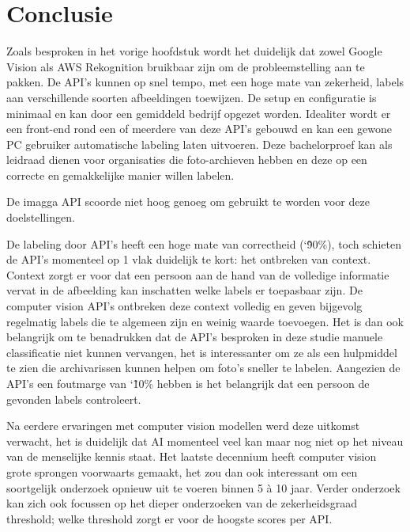 
\chapter{Conclusie}
\label{ch:conclusie}


Zoals besproken in het vorige hoofdstuk wordt het duidelijk dat zowel Google Vision als AWS Rekognition bruikbaar zijn om de probleemstelling aan te pakken. De API's kunnen op snel tempo, met een hoge mate van zekerheid, labels aan verschillende soorten afbeeldingen toewijzen. De setup en configuratie is minimaal en kan door een gemiddeld bedrijf opgezet worden. Idealiter wordt er een front-end rond een of meerdere van deze API's gebouwd en kan een gewone PC gebruiker automatische labeling laten uitvoeren. Deze bachelorproef kan als leidraad dienen voor organisaties die foto-archieven hebben en deze op een correcte en gemakkelijke manier willen labelen. 

De imagga API scoorde niet hoog genoeg om gebruikt te worden voor deze doelstellingen.

De labeling door API's heeft een hoge mate van correctheid (\char`\~ 90\%), toch schieten de API's momenteel op 1 vlak duidelijk te kort: het ontbreken van context. Context zorgt er voor dat een persoon aan de hand van de volledige informatie vervat in de afbeelding kan inschatten welke labels er toepasbaar zijn. De computer vision API's ontbreken deze context volledig en geven bijgevolg regelmatig labels die te algemeen zijn en weinig waarde toevoegen. Het is dan ook belangrijk om te benadrukken dat de API's besproken in deze studie manuele classificatie niet kunnen vervangen, het is interessanter om ze als een hulpmiddel te zien die archivarissen kunnen helpen om foto's sneller te labelen. Aangezien de API's een foutmarge van \char`\~ 10\% hebben is het belangrijk dat een persoon de gevonden labels controleert.

Na eerdere ervaringen met computer vision modellen werd deze uitkomst verwacht, het is duidelijk dat AI momenteel veel kan maar nog niet op het niveau van de menselijke kennis staat. Het laatste decennium heeft computer vision grote sprongen voorwaarts gemaakt, het zou dan ook interessant om een soortgelijk onderzoek opnieuw uit te voeren binnen 5 à 10 jaar. Verder onderzoek kan zich ook focussen op het dieper onderzoeken van de zekerheidsgraad threshold; welke threshold zorgt er voor de hoogste scores per API.